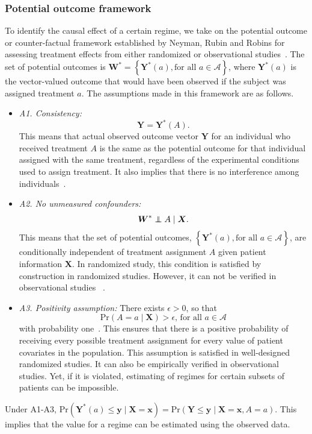 \documentclass{article}
\newcommand{\bs}{ \boldsymbol}
\newcommand{\ml}{\mathcal}
\newcommand{\lt}{\left}
\newcommand{\rt}{\right}
\newcommand\indep{\protect\mathpalette{\protect\independenT}{\perp}}
\def\independenT#1#2{\mathrel{\rlap{$#1#2$}\mkern2mu{#1#2}}}
\begin{document}
\subsubsection{Potential outcome framework}
To identify the causal effect of a certain regime, we take on the potential outcome or counter-factual framework established by Neyman, Rubin and Robins for assessing treatment effects from either randomized or observational studies~\cite{Neyman,Rubin2005, Rubin1980, Robins1997, Hernan2006}.
The set of potential outcomes is $\bs{W}^{*} = \lt\{ \bs{Y}^*\lt(a\rt), \text{for all } a \in \ml{A} \rt\}$, where $\bs{Y}^{*}\lt(a\rt)$ is the vector-valued outcome that would have been observed if the subject was assigned treatment $a$. The assumptions made in this framework are as follows.
\begin{itemize}
\item \textit{A1. Consistency:}
$$\bs{Y} = \bs{Y}^{*}\lt(A\rt).$$
This means that actual observed outcome vector $\bs{Y}$ for an individual who received treatment $A$ is the same as the potential outcome for that individual assigned with the same  treatment, regardless of the experimental conditions used to assign treatment. It also implies that there is no interference among individuals~\cite{Rubin1980}. 
	
\item \textit{A2. No unmeasured confounders:}
	$$\bs{W}^* \indep  A \mid \bs{X}.$$
This means that the set of potential outcomes, $\lt\{ \bs{Y}^*\lt(a\rt), \text{for all } a \in \ml{A} \rt\}$, are conditionally independent of treatment assignment $A$ given patient information $\bs{X}$. In randomized study, this condition is satisfied by construction in randomized studies. However, it can not be verified in observational studies
	~\cite{Robins1997}.
	\item \textit{A3. Positivity assumption:}
  There exists $\epsilon > 0$, so that 
  $$\text{Pr}(A = a \mid \bs{X}) > \epsilon \text{, for all } a 
  \in \ml{A}$$ with probability one~\cite{Hernan2006}. This ensures that there is a positive probability of receiving every possible treatment assignment for every value of patient covariates in the population. This assumption is satisfied in well-designed randomized studies. It can also be empirically verified in observational studies. Yet, if it is violated, estimating of regimes for certain subsets of patients can be impossible.
\end{itemize}
Under A1-A3, $\text{Pr}\lt(\bs{Y}^*\lt(a\rt) \le \bs{y} \mid \bs{X} = \bs{x}\rt) = \text{Pr}\lt(\bs{Y} \le \bs{y} \mid \bs{X} = \bs{x}, A = a\rt)$. This implies that the value for a regime can be estimated using the observed data.
\end{document}
